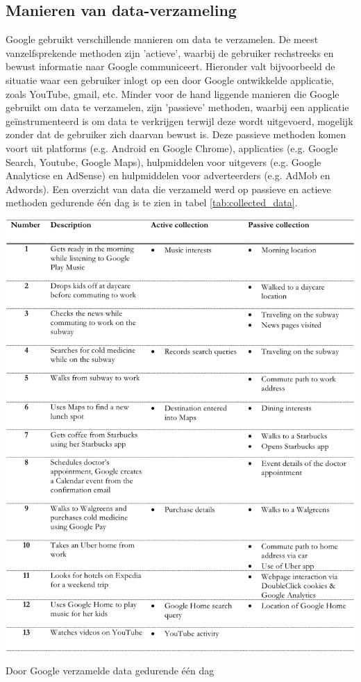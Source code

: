 \subsection{Manieren van data-verzameling} \label{ways-of-data-collection}

Google gebruikt verschillende manieren om data te verzamelen. De meest vanzelfsprekende methoden zijn 'actieve', waarbij de gebruiker rechstreeks en bewust informatie naar Google communiceert. Hieronder valt bijvoorbeeld de situatie waar een gebruiker inlogt op een door Google ontwikkelde applicatie, zoals YouTube, gmail, etc. Minder voor de hand liggende manieren die Google gebruikt om data te verzamelen, zijn 'passieve' methoden, waarbij een applicatie geïnstrumenteerd is om data te verkrijgen terwijl deze wordt uitgevoerd, mogelijk zonder dat de gebruiker zich daarvan bewust is. Deze passieve methoden komen voort uit platforms (e.g. Android en Google Chrome), applicaties (e.g. Google Search, Youtube, Google Maps), hulpmiddelen voor uitgevers (e.g. Google Analyticse en AdSense) en hulpmiddelen voor adverteerders (e.g. AdMob en Adwords). Een overzicht van data die verzameld werd op passieve en actieve methoden gedurende één dag is te zien in tabel \ref{tab:collected_data}.

\begin{table}
    \centering
    \includegraphics[width=1\textwidth]{img/collecteddata.png}
    \caption{Door Google verzamelde data gedurende één dag}
    \label{tab:collected_data}
    \cite{schmidt_google-data-collection}
\end{table}

